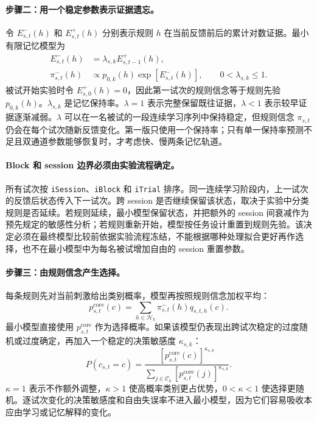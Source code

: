 \paragraph{步骤二：用一个稳定参数表示证据遗忘。}
令 $E^-_{s,t}(h)$ 和 $E^+_{s,t}(h)$ 分别表示规则 $h$ 在当前反馈前后的累计对数证据。最小有限记忆模型为
\begin{align}
    E^-_{s,t}(h)&=\lambda_{s,k}E^+_{s,t-1}(h),\\
    \pi^-_{s,t}(h)&\propto p_{0,k}(h)\exp[E^-_{s,t}(h)],
    \qquad 0<\lambda_{s,k}\leq1 .
    \label{eq:newplan-prefeedback-belief}
\end{align}
被试开始实验时令 $E^+_{s,0}(h)=0$，因此第一试次的规则信念等于规则先验 $p_{0,k}(h)$。$\lambda_{s,k}$ 是记忆保持率。$\lambda=1$ 表示完整保留既往证据，$\lambda<1$ 表示较早证据逐渐减弱。$\lambda$ 可以在一名被试的一段连续学习序列中保持稳定，但规则信念 $\pi_{s,t}$ 仍会在每个试次随新反馈变化。第一版只使用一个保持率；只有单一保持率预测不足且双通道参数能够恢复时，才考虑快、慢两条记忆轨道。

\paragraph{Block 和 session 边界必须由实验流程确定。}
所有试次按 \texttt{iSession}、\texttt{iBlock} 和 \texttt{iTrial} 排序。同一连续学习阶段内，上一试次的反馈后状态传入下一试次。跨 session 是否继续保留该状态，取决于实验中分类规则是否延续。若规则延续，最小模型保留状态，并把额外的 session 间衰减作为预先规定的敏感性分析；若规则重新开始，模型按任务设计重置到规则先验。该决定必须在最终模型比较前依据实验流程冻结，不能根据哪种处理拟合更好再作选择，也不在最小模型中为每名被试增加自由的 session 重置参数。

\paragraph{步骤三：由规则信念产生选择。}
每条规则先对当前刺激给出类别概率，模型再按照规则信念加权平均：
\begin{equation}
    p^{\mathrm{core}}_{s,t}(c)
    =\sum_{h\in\mathcal H_k}
      \pi^-_{s,t}(h)q_{s,t,h}(c).
    \label{eq:newplan-core-choice}
\end{equation}
最小模型直接使用 $p^{\mathrm{core}}_{s,t}$ 作为选择概率。如果该模型仍表现出跨试次稳定的过度随机或过度确定，再加入一个稳定的决策敏感度 $\kappa_{s,k}$：
\begin{equation}
    P(c_{s,t}=c)
    =\frac{[p^{\mathrm{core}}_{s,t}(c)]^{\kappa_{s,k}}}
    {\sum_{j\in\mathcal C_k}[p^{\mathrm{core}}_{s,t}(j)]^{\kappa_{s,k}}}.
    \label{eq:newplan-stable-choice-noise}
\end{equation}
$\kappa=1$ 表示不作额外调整，$\kappa>1$ 使高概率类别更占优势，$0<\kappa<1$ 使选择更随机。逐试次变化的决策敏感度和自由失误率不进入最小模型，因为它们容易吸收本应由学习或记忆解释的变化。


